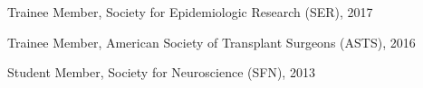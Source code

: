 \documentclass[10pt]{article}
\renewcommand{\section}[1]{\pagebreak[3]%
    \vspace{1.3\baselineskip}%
    \phantomsection\addcontentsline{toc}{section}{#1}%
    \noindent\llap{\scshape\smash{\parbox[t]{\marginparwidth}{\hyphenpenalty=10000\raggedright #1}}}%
    \vspace{-\baselineskip}\par}
\begin{document}
\begin{innerlist}
\item Trainee Member, Society for Epidemiologic Research (SER), 2017
\item Trainee Member, American Society of Transplant Surgeons (ASTS), 2016
\item Student Member, Society for Neuroscience (SFN), 2013

\end{innerlist}

\end{document}
